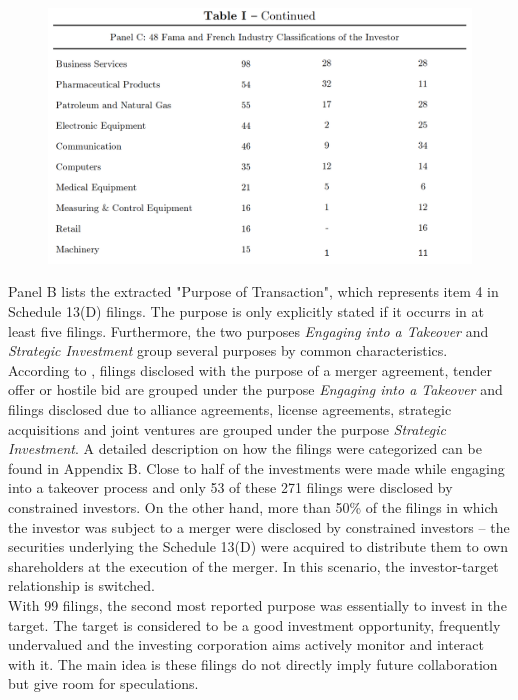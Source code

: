 \documentclass[12pt]{article}
\begin{document}
\begin{figure}[!htb]
	\centering
	\begin{adjustbox}{width=\textwidth}
		\includegraphics{Descriptive}
	\end{adjustbox}
\end{figure}
\noindent Panel B lists the extracted "Purpose of Transaction", which represents item 4 in Schedule 13(D) filings. The purpose is only explicitly stated if it occurrs in at least five filings. Furthermore, the two purposes \emph{Engaging into a Takeover} and \emph{Strategic Investment} group several purposes by common characteristics. According to \citet[p.1]{Betton2008}, filings disclosed with the purpose of a merger agreement, tender offer or hostile bid are grouped under the purpose \emph{Engaging into a Takeover} and filings disclosed due to alliance agreements, license agreements, strategic acquisitions and joint ventures are grouped under the purpose \emph{Strategic Investment}. A detailed description on how the filings were categorized can be found in Appendix B. 
Close to half of the investments were made while engaging into a takeover process and only 53 of these 271 filings were disclosed by constrained investors. On the other hand, more than 50\% of the filings in which the investor was subject to a merger were disclosed by constrained investors -- the securities underlying the Schedule 13(D) were acquired to distribute them to own shareholders at the execution of the merger. In this scenario, the investor-target relationship is switched.\\
With 99 filings, the second most reported purpose was essentially to invest in the target. The target is considered to be a good investment opportunity, frequently undervalued and the investing corporation aims actively monitor and interact with it. The main idea is these filings do not directly imply future collaboration but give room for speculations.\\
\end{document}
